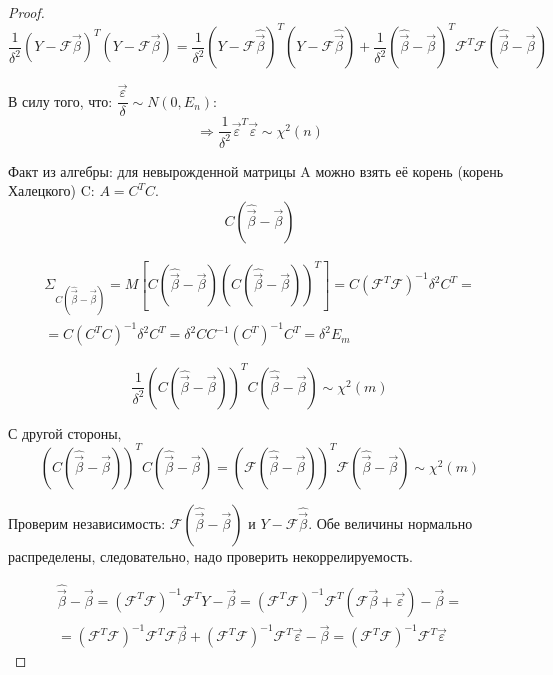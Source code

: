 \begin{proof}
  \[
    \dfrac{1}{\delta^2} (Y - \mathcal{F} \vec{\beta})^T (Y - \mathcal{F} \vec{\beta})
    = \dfrac{1}{\delta^2} 
    (Y - \mathcal{F} \hat{\vec{\beta}})^T
    (Y - \mathcal{F} \hat{\vec{\beta}}) 
    + \dfrac{1}{\delta^2} 
    (\hat{\vec{\beta}} - \vec{\beta})^T 
    \mathcal{F}^T \mathcal{F}
    (\hat{\vec{\beta}} - \vec{\beta})
  \]

  В силу того, что:
  $\dfrac{\vec{\varepsilon}}{\delta} \sim N(0, E_n)$:
  \[
    \Rightarrow 
    \dfrac{1}{\delta^2} \vec{\varepsilon}^T \vec{\varepsilon}
    \sim \chi^2(n)
  \]

  Факт из алгебры: для невырожденной матрицы A можно взять её корень (корень Халецкого) C: 
  $A = C^T C$.
  \[
    C (\hat{\vec{\beta}} - \vec{\beta})
  \]

  \begin{multline*}
    \Sigma_{C (\hat{\vec{\beta}} - \vec{\beta})}
    = M \left[
      C (\hat{\vec{\beta}} - \vec{\beta})
      \left( C (\hat{\vec{\beta}} - \vec{\beta}) \right)^T \right]
    = C ( \mathcal{F}^T \mathcal{F} )^{-1} \delta^2 C^T = \\
    = C (C^T C)^{-1} \delta^2 C^T
    = \delta^2 C C^{-1} (C^T)^{-1} C^T
    = \delta^2 E_m
  \end{multline*}

  \[
    \dfrac{1}{\delta^2}
    ( C (\hat{\vec{\beta}} - \vec{\beta}) )^T
    C (\hat{\vec{\beta}} - \vec{\beta})
    \sim
    \chi^2 (m)
  \]

  С другой стороны,
  \[
    ( C (\hat{\vec{\beta}} - \vec{\beta}) )^T
    C (\hat{\vec{\beta}} - \vec{\beta})
    = 
    ( \mathcal{F} (\hat{\vec{\beta}} - \vec{\beta}) )^T
    \mathcal{F} (\hat{\vec{\beta}} - \vec{\beta})
    \sim
    \chi^2 (m)
  \]

  Проверим независимость: $\mathcal{F} (\hat{\vec{\beta}} - \vec{\beta})$ и $Y - \mathcal{F} \hat{\vec{\beta}}$.
  Обе величины нормально распределены, следовательно, надо проверить некоррелируемость.

  \begin{multline*}
    \hat{\vec{\beta}} - \vec{\beta}
    = (\mathcal{F}^T \mathcal{F})^{-1} \mathcal{F}^T Y - \vec{\beta}
    = (\mathcal{F}^T \mathcal{F})^{-1} \mathcal{F}^T ( \mathcal{F} \vec{\beta} + \vec{\varepsilon} ) - \vec{\beta} = \\
    = (\mathcal{F}^T \mathcal{F})^{-1} \mathcal{F}^T \mathcal{F} \vec{\beta}
    + (\mathcal{F}^T \mathcal{F})^{-1} \mathcal{F}^T \vec{\varepsilon} - \vec{\beta}
    = (\mathcal{F}^T \mathcal{F})^{-1} \mathcal{F}^T \vec{\varepsilon}
  \end{multline*}


\end{proof}
